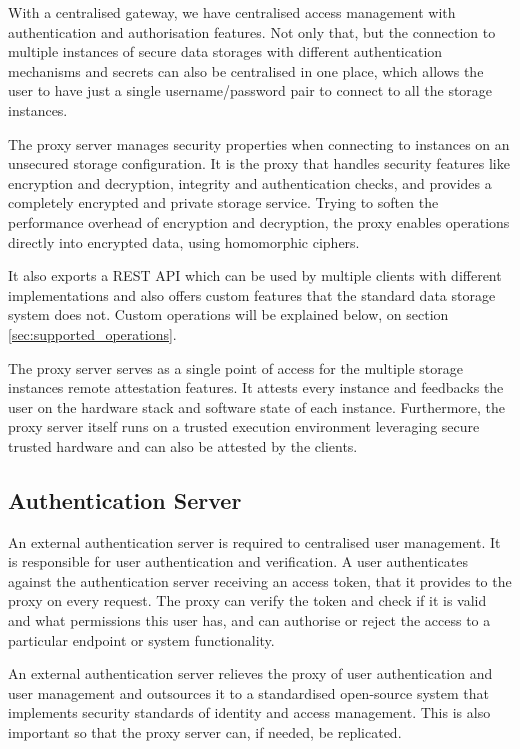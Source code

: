 With a centralised gateway, we have centralised access management with authentication and authorisation features. Not only that, but the connection to multiple instances of secure data storages with different authentication mechanisms and secrets can also be centralised in one place, which allows the user to have just a single username/password pair to connect to all the storage instances.

The proxy server manages security properties when connecting to instances on an unsecured storage configuration. It is the proxy that handles security features like encryption and decryption, integrity and authentication checks, and provides a completely encrypted and private storage service. Trying to soften the performance overhead of encryption and decryption, the proxy enables operations directly into encrypted data, using homomorphic ciphers. 

It also exports a \gls{REST} \gls{API} which can be used by multiple clients with different implementations and also offers custom features that the standard data storage system does not. Custom operations will be explained below, on section \ref{sec:supported_operations}.

The proxy server serves as a single point of access for the multiple storage instances remote attestation features. It attests every instance and feedbacks the user on the hardware stack and software state of each instance. Furthermore, the proxy server itself runs on a trusted execution environment leveraging secure trusted hardware and can also be attested by the clients.

\subsection{Authentication Server}
\label{ssec:authentication_server}

An external authentication server is required to centralised user management. It is responsible for user authentication and verification. A user authenticates against the authentication server receiving an access token, that it provides to the proxy on every request. The proxy can verify the token and check if it is valid and what permissions this user has, and can authorise or reject the access to a particular endpoint or system functionality.

An external authentication server relieves the proxy of user authentication and user management and outsources it to a standardised open-source system that implements security standards of identity and access management. This is also important so that the proxy server can, if needed, be replicated.

